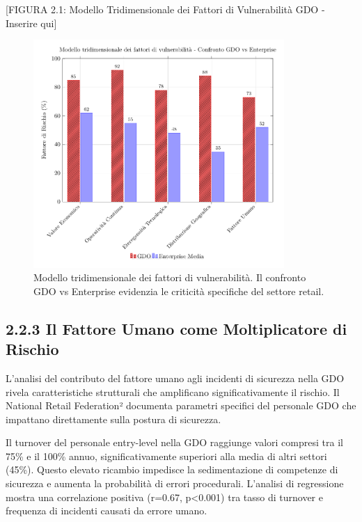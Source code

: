 \documentclass[12pt,a4paper,oneside]{book}
\numberwithin{figure}{chapter} %
\numberwithin{table}{chapter}  %
\begin{document}
{[}FIGURA 2.1: Modello Tridimensionale dei Fattori di Vulnerabilità GDO
- Inserire qui{]}
\begin{figure}[htbp]
    \centering
    \includegraphics[width=0.85\textwidth]{figura 2-1}
    \caption{Modello tridimensionale dei fattori di vulnerabilità. Il confronto GDO vs Enterprise evidenzia le criticità specifiche del settore retail.}
    \label{fig:vulnerabilita_gdo}
\end{figure}

\subsection{2.2.3 Il Fattore Umano come Moltiplicatore di
Rischio}\label{il-fattore-umano-come-moltiplicatore-di-rischio}

L'analisi del contributo del fattore umano agli incidenti di sicurezza
nella GDO rivela caratteristiche strutturali che amplificano
significativamente il rischio. Il National Retail Federation² documenta
parametri specifici del personale GDO che impattano direttamente sulla
postura di sicurezza.

Il turnover del personale entry-level nella GDO raggiunge valori
compresi tra il 75\% e il 100\% annuo, significativamente superiori alla
media di altri settori (45\%). Questo elevato ricambio impedisce la
sedimentazione di competenze di sicurezza e aumenta la probabilità di
errori procedurali. L'analisi di regressione mostra una correlazione
positiva (r=0.67, p\textless0.001) tra tasso di turnover e frequenza di
incidenti causati da errore umano.
\end{document}
